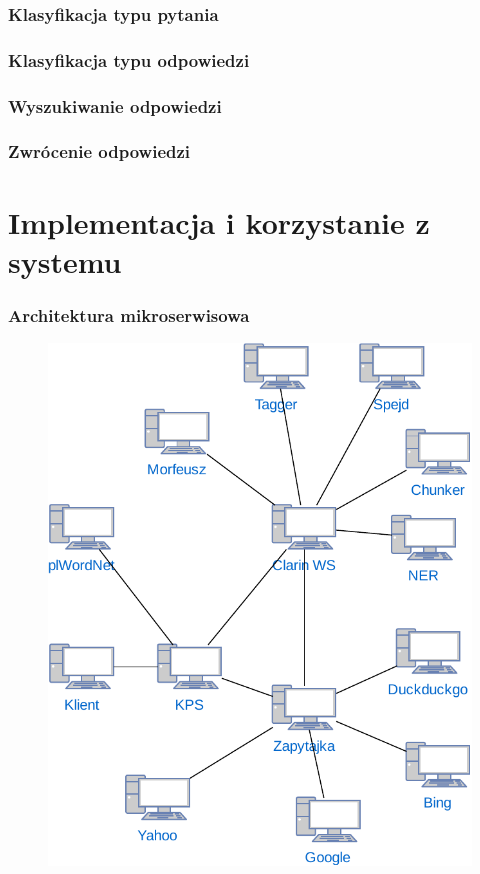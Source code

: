 \documentclass{beamer}
\begin{document}
\begin{frame}
  \frametitle{Klasyfikacja typu pytania}

\end{frame}

\begin{frame}
  \frametitle{Klasyfikacja typu odpowiedzi}

\end{frame}

\begin{frame}
  \frametitle{Wyszukiwanie odpowiedzi}

\end{frame}

\begin{frame}
  \frametitle{Zwrócenie odpowiedzi}

\end{frame}

\section{Implementacja i korzystanie z systemu}
\begin{frame}
  \frametitle{Architektura mikroserwisowa}
  \begin{figure}
    \centering
    \includegraphics[width=0.5\columnwidth]{figures/WEDT-Uslugi.pdf}
    \label{fig:klient}
  \end{figure}
\end{frame}
\end{document}
